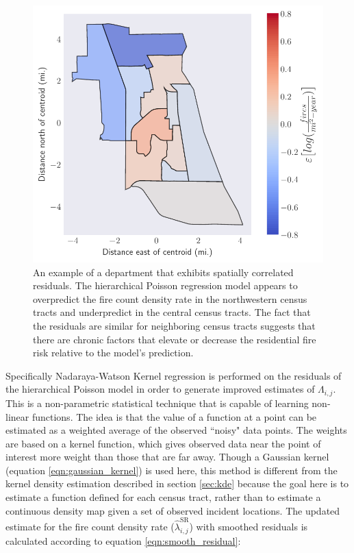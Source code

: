 \documentclass{svjour3}
\begin{document}
\begin{figure}[htb] \centering
\includegraphics[width=.75\textwidth]{figures/spatial_correlation.pdf}
\caption{An example of a department that exhibits spatially correlated residuals. The hierarchical Poisson regression model appears to overpredict the fire count density rate in the northwestern census tracts and underpredict in the central census tracts. The fact that the residuals are similar for neighboring census tracts suggests that there are chronic factors that elevate or decrease the residential fire risk relative to the model's prediction.}
\label{fig:spatialcorr}
\end{figure}

Specifically Nadaraya-Watson\cite{nadaraya1964estimating} Kernel regression is performed on the residuals of the hierarchical Poisson model in order to generate improved estimates of $\Lambda_{i,j}$. This is a non-parametric statistical technique that is capable of learning non-linear functions. The idea is that the value of a function at a point can be estimated as a weighted average of the observed ``noisy" data points.  The weights are based on a kernel function, which gives observed data near the point of interest more weight than those that are far away. Though a Gaussian kernel (equation \ref{eqn:gaussian_kernel}) is used here, this method is different from the kernel density estimation described in section \ref{sec:kde} because the goal here is to estimate a function defined for each census tract, rather than to estimate a continuous density map given a set of observed incident locations. The updated estimate for the fire count density rate ($\hat{\lambda}^{\text{SR}}_{i,j}$) with smoothed residuals is calculated according to equation \ref{eqn:smooth_residual}:
\end{document}
